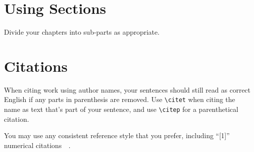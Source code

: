 \documentclass[main.tex]{subfiles}
\begin{document}
    \section{Using Sections}

        Divide your chapters into sub-parts as appropriate.

    \section{Citations}

        When citing work using author names, your sentences should still read as
            correct English if any parts in parenthesis are removed.
        Use {\tt {\textbackslash}citet} when citing the name as text that's part of
            your sentence, and use {\tt {\textbackslash}citep} for a parenthetical
            citation.

        You may use any consistent reference style that you prefer, including ``[1]''
            numerical citations~\cite{P1}~\cite{P2}.
\end{document}
